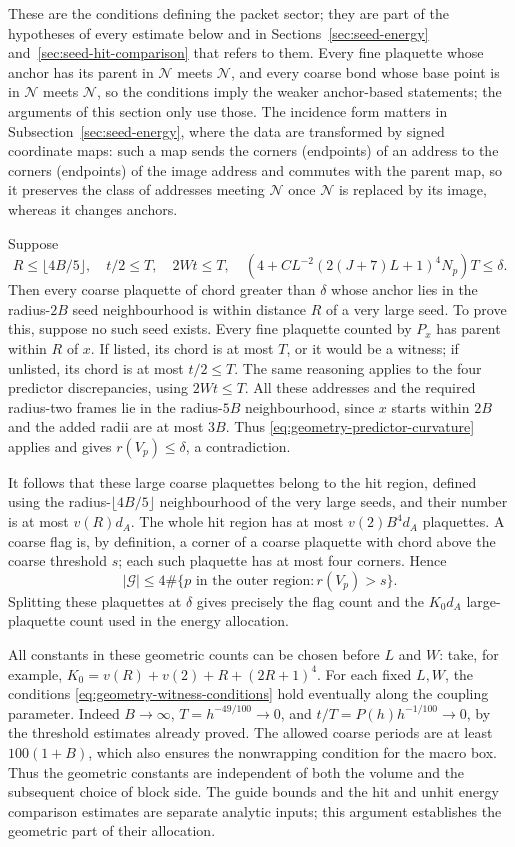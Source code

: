 These are the conditions defining the packet sector; they are part of
the hypotheses of every estimate below and in
Sections~\ref{sec:seed-energy} and~\ref{sec:seed-hit-comparison} that
refers to them. Every fine plaquette whose anchor has its parent in
$\mathcal N$ meets $\mathcal N$, and every coarse bond whose base point is
in $\mathcal N$ meets $\mathcal N$, so the conditions imply the weaker
anchor-based statements; the arguments of this section only use those.
The incidence form matters in Subsection~\ref{sec:seed-energy}, where the
data are transformed by signed coordinate maps: such a map sends the
corners (endpoints) of an address to the corners (endpoints) of the
image address and commutes with the parent map, so it preserves the
class of addresses meeting $\mathcal N$ once $\mathcal N$ is replaced by
its image, whereas it changes anchors.

Suppose
\begin{equation}\label{eq:geometry-witness-conditions}
 R\le\lfloor4B/5\rfloor,\quad t/2\le T,\quad2Wt\le T,\quad
 \left(4+CL^{-2}(2(J+7)L+1)^4N_p\right)T\le\delta.
\end{equation}
Then every coarse plaquette of chord greater than $\delta$ whose
anchor lies in the radius-$2B$ seed neighbourhood is within distance
$R$ of a very large seed. To prove this, suppose no such seed exists.
Every fine plaquette counted by $P_x$ has parent within $R$ of $x$.
If listed, its chord is at most $T$, or it would be a witness; if
unlisted, its chord is at most $t/2\le T$. The same reasoning applies
to the four predictor discrepancies, using $2Wt\le T$. All these
addresses and the required radius-two frames lie in the radius-$5B$
neighbourhood, since $x$ starts within $2B$ and the added radii are
at most $3B$. Thus \eqref{eq:geometry-predictor-curvature} applies and
gives $r(V_p)\le\delta$, a contradiction.

It follows that these large coarse plaquettes belong to the hit
region, defined using the radius-$\lfloor4B/5\rfloor$ neighbourhood
of the very large seeds, and their number is at most $v(R)d_A$.
The whole hit region has at most $v(2)B^4d_A$ plaquettes. A coarse
flag is, by definition, a corner of a coarse plaquette with chord
above the coarse threshold $s$; each such plaquette has at most four
corners. Hence
\[
 |\mathcal G|\le4\#\{p\text{ in the outer region}:r(V_p)>s\}.
\]
Splitting these plaquettes at $\delta$ gives precisely the flag count
and the $K_0d_A$ large-plaquette count used in the energy allocation.

All constants in these geometric counts can be chosen before $L$
and $W$: take, for example,
$K_0=v(R)+v(2)+R+(2R+1)^4$. For each fixed $L,W$, the conditions
\eqref{eq:geometry-witness-conditions} hold eventually along the
coupling parameter. Indeed $B\to\infty$, $T=h^{-49/100}\to0$, and
$t/T=P(h)h^{-1/100}\to0$, by the threshold estimates already proved.
The allowed coarse periods are at least $100(1+B)$, which also
ensures the nonwrapping condition for the macro box. Thus the
geometric constants are independent of both the volume and the
subsequent choice of block side. The guide bounds and the hit and
unhit energy comparison estimates are separate analytic inputs;
this argument establishes the geometric part of their allocation.
